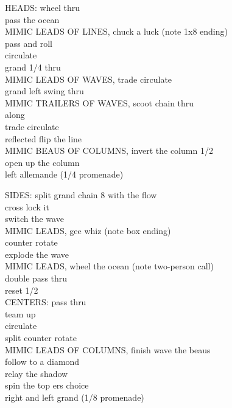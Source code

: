 \documentclass[12pt]{article}
\begin{document}
HEADS: wheel thru\\
pass the ocean\\
MIMIC LEADS OF LINES, chuck a luck (note 1x8 ending)\\
pass and roll\\
circulate\\
grand 1/4 thru\\
MIMIC LEADS OF WAVES, trade circulate\\
grand left swing thru\\
MIMIC TRAILERS OF WAVES, scoot chain thru\\
along\\
trade circulate\\
reflected flip the line\\
MIMIC BEAUS OF COLUMNS, invert the column 1/2\\
open up the column\\
left allemande  (1/4 promenade)\\
\endsequence

SIDES: split grand chain 8 with the flow\\
cross lock it\\
switch the wave\\
MIMIC LEADS, gee whiz (note box ending) \\
counter rotate\\
explode the wave\\
MIMIC LEADS, wheel the ocean (note two-person call)\\
{}
double pass thru\\
reset 1/2 \\
CENTERS: pass thru\\
team up\\
circulate\\
split counter rotate\\
MIMIC LEADS OF COLUMNS, finish wave the beaus \\
follow to a diamond\\
relay the shadow\\
spin the top ers choice\\
right and left grand (1/8 promenade)
\endsequence
\end{document}
